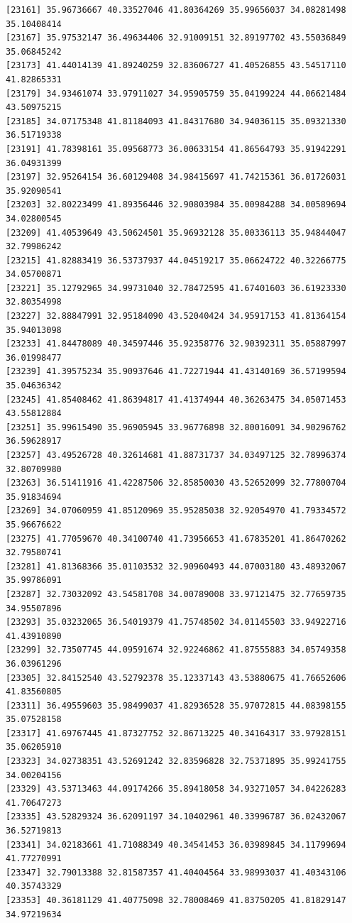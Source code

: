 \documentclass[
  letterpaper,
  DIV=11,
  numbers=noendperiod]{scrartcl}
\begin{document}
\begin{verbatim}
[23161] 35.96736667 40.33527046 41.80364269 35.99656037 34.08281498 35.10408414
[23167] 35.97532147 36.49634406 32.91009151 32.89197702 43.55036849 35.06845242
[23173] 41.44014139 41.89240259 32.83606727 41.40526855 43.54517110 41.82865331
[23179] 34.93461074 33.97911027 34.95905759 35.04199224 44.06621484 43.50975215
[23185] 34.07175348 41.81184093 41.84317680 34.94036115 35.09321330 36.51719338
[23191] 41.78398161 35.09568773 36.00633154 41.86564793 35.91942291 36.04931399
[23197] 32.95264154 36.60129408 34.98415697 41.74215361 36.01726031 35.92090541
[23203] 32.80223499 41.89356446 32.90803984 35.00984288 34.00589694 34.02800545
[23209] 41.40539649 43.50624501 35.96932128 35.00336113 35.94844047 32.79986242
[23215] 41.82883419 36.53737937 44.04519217 35.06624722 40.32266775 34.05700871
[23221] 35.12792965 34.99731040 32.78472595 41.67401603 36.61923330 32.80354998
[23227] 32.88847991 32.95184090 43.52040424 34.95917153 41.81364154 35.94013098
[23233] 41.84478089 40.34597446 35.92358776 32.90392311 35.05887997 36.01998477
[23239] 41.39575234 35.90937646 41.72271944 41.43140169 36.57199594 35.04636342
[23245] 41.85408462 41.86394817 41.41374944 40.36263475 34.05071453 43.55812884
[23251] 35.99615490 35.96905945 33.96776898 32.80016091 34.90296762 36.59628917
[23257] 43.49526728 40.32614681 41.88731737 34.03497125 32.78996374 32.80709980
[23263] 36.51411916 41.42287506 32.85850030 43.52652099 32.77800704 35.91834694
[23269] 34.07060959 41.85120969 35.95285038 32.92054970 41.79334572 35.96676622
[23275] 41.77059670 40.34100740 41.73956653 41.67835201 41.86470262 32.79580741
[23281] 41.81368366 35.01103532 32.90960493 44.07003180 43.48932067 35.99786091
[23287] 32.73032092 43.54581708 34.00789008 33.97121475 32.77659735 34.95507896
[23293] 35.03232065 36.54019379 41.75748502 34.01145503 33.94922716 41.43910890
[23299] 32.73507745 44.09591674 32.92246862 41.87555883 34.05749358 36.03961296
[23305] 32.84152540 43.52792378 35.12337143 43.53880675 41.76652606 41.83560805
[23311] 36.49559603 35.98499037 41.82936528 35.97072815 44.08398155 35.07528158
[23317] 41.69767445 41.87327752 32.86713225 40.34164317 33.97928151 35.06205910
[23323] 34.02738351 43.52691242 32.83596828 32.75371895 35.99241755 34.00204156
[23329] 43.53713463 44.09174266 35.89418058 34.93271057 34.04226283 41.70647273
[23335] 43.52829324 36.62091197 34.10402961 40.33996787 36.02432067 36.52719813
[23341] 34.02183661 41.71088349 40.34541453 36.03989845 34.11799694 41.77270991
[23347] 32.79013388 32.81587357 41.40404564 33.98993037 41.40343106 40.35743329
[23353] 40.36181129 41.40775098 32.78008469 41.83750205 41.81829147 34.97219634

\end{verbatim}
\end{document}

